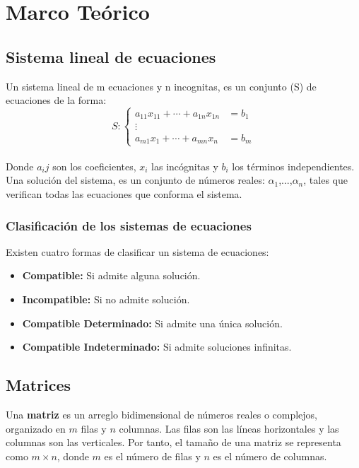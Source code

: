 \documentclass{article}
\begin{document}
    \section{Marco Teórico}

    \subsection{Sistema lineal de ecuaciones}
    Un sistema lineal de m ecuaciones y n incognitas, es un conjunto (S) de ecuaciones de la forma:\\
    \[
        S: \left\{
        \begin{aligned}
            a_{11}x_{11} + \cdots + a_{1n}x_{1n} &= b_1 \\
            \vdots \hspace{3em}\\
            a_{m1}x_{1} + \cdots + a_{mn}x_{n} &= b_m
        \end{aligned}
        \right.
    \]
    \\
    Donde $a_ij$ son los coeficientes, $x_i$ las incógnitas y $b_i$ los términos independientes.\\

    Una solución del sistema, es un conjunto de números reales: $\alpha_1$,...,$\alpha_n$, tales que verifican todas las ecuaciones que conforma el sistema.

    \subsubsection{Clasificación de los sistemas de ecuaciones}
    Existen cuatro formas de clasificar un sistema de ecuaciones:
    \begin{itemize}
        \item \textbf{Compatible:} Si admite alguna solución.
        \item \textbf{Incompatible:} Si no admite solución.
        \item \textbf{Compatible Determinado:} Si admite una única solución.
        \item \textbf{Compatible Indeterminado:} Si admite soluciones infinitas.
    \end{itemize}

    \subsection{Matrices}
    Una \textbf{matriz} es un arreglo bidimensional de números reales o complejos, organizado en $m$ filas y $n$ columnas. Las filas son las líneas horizontales y las columnas son las verticales. Por tanto, el tamaño de una matriz se representa como $m \times n$, donde $m$ es el número de filas y $n$ es el número de columnas.
\end{document}
